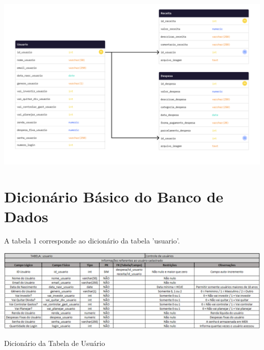     \vspace{\baselineskip}
    \begin{center}
        \begin{minipage}{\textwidth}
            \centering
            \includegraphics[scale=0.18]{figs/uml.png}
            \label{fig:uml}
        \end{minipage}
    \end{center}

\section{Dicionário Básico do Banco de Dados}

    A tabela 1 corresponde ao dicionário da tabela 'usuario'.

\begin{table}[ht]
    \centering
    \setlength{\extrarowheight}{3pt}  %

    \begin{center}
        \begin{minipage}{\textwidth}
            \centering
            \includegraphics[scale=0.5]{figs/tab1.png}
        \end{minipage}
    \end{center}

    \caption{Dicionário da Tabela de Usuário}
    \label{tab:tab1}
\end{table}


